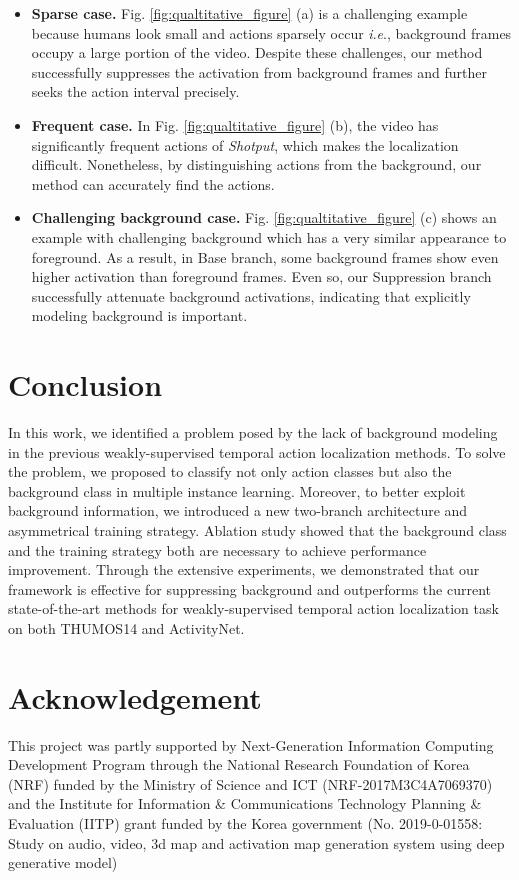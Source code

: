 \documentclass[letterpaper]{article} %
\newcommand{\ie}{\textit{i}.\textit{e}.}
\newcommand{\Fref}[1]{Fig. \ref{#1}}
\begin{document}
\begin{itemize}
    \item \textbf{Sparse case.} \Fref{fig:qualtitative_figure} (a) is a challenging example because humans look small and actions sparsely occur \ie, background frames occupy a large portion of the video. Despite these challenges, our method successfully suppresses the activation from background frames and further seeks the action interval precisely.
    \item \textbf{Frequent case.} In \Fref{fig:qualtitative_figure} (b), the video has significantly frequent actions of \textit{Shotput}, which makes the localization difficult. Nonetheless, by distinguishing actions from the background, our method can accurately find the actions.
    \item \textbf{Challenging background case.} \Fref{fig:qualtitative_figure} (c) shows an example with challenging background which has a very similar appearance to foreground. As a result, in Base branch, some background frames show even higher activation than foreground frames. Even so, our Suppression branch successfully attenuate background activations, indicating that explicitly modeling background is important.
\end{itemize}

\section{Conclusion}

In this work, we identified a problem posed by the lack of background modeling in the previous weakly-supervised temporal action localization methods. To solve the problem, we proposed to classify not only action classes but also the background class in multiple instance learning.
Moreover,
to better exploit background information, we introduced a new two-branch architecture and asymmetrical training strategy.
Ablation study showed that the background class and the training strategy both are necessary to achieve performance improvement.
Through the extensive experiments, we demonstrated that our framework is effective for suppressing background and outperforms the current state-of-the-art methods for weakly-supervised temporal action localization task on both THUMOS14 and ActivityNet.

\section{Acknowledgement}
{\small
This project was partly supported by Next-Generation Information Computing Development Program through the National Research Foundation of Korea (NRF) funded by the Ministry of Science and ICT (NRF-2017M3C4A7069370) and the Institute for Information \& Communications Technology Planning \& Evaluation (IITP) grant funded by the Korea government (No. 2019-0-01558: Study on audio, video, 3d map and activation map generation system using deep generative model)
}
\end{document}
